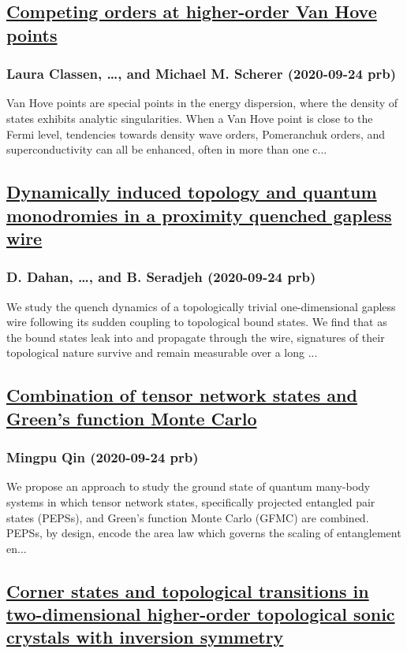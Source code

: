 \subsection*{\href{http://link.aps.org/doi/10.1103/PhysRevB.102.125141}{Competing orders at higher-order Van Hove points}}
\subsubsection*{Laura Classen, \dots, and Michael M. Scherer (2020-09-24 prb)}
Van Hove points are special points in the energy dispersion, where the density of states exhibits analytic singularities. When a Van Hove point is close to the Fermi level, tendencies towards density wave orders, Pomeranchuk orders, and superconductivity can all be enhanced, often in more than one c...
\subsection*{\href{http://link.aps.org/doi/10.1103/PhysRevB.102.125142}{Dynamically induced topology and quantum monodromies in a proximity quenched gapless wire}}
\subsubsection*{D. Dahan, \dots, and B. Seradjeh (2020-09-24 prb)}
We study the quench dynamics of a topologically trivial one-dimensional gapless wire following its sudden coupling to topological bound states. We find that as the bound states leak into and propagate through the wire, signatures of their topological nature survive and remain measurable over a long ...
\subsection*{\href{http://link.aps.org/doi/10.1103/PhysRevB.102.125143}{Combination of tensor network states and Green's function Monte Carlo}}
\subsubsection*{Mingpu Qin (2020-09-24 prb)}
We propose an approach to study the ground state of quantum many-body systems in which tensor network states, specifically projected entangled pair states (PEPSs), and Green's function Monte Carlo (GFMC) are combined. PEPSs, by design, encode the area law which governs the scaling of entanglement en...
\subsection*{\href{http://link.aps.org/doi/10.1103/PhysRevB.102.125144}{Corner states and topological transitions in two-dimensional higher-order topological sonic crystals with inversion symmetry}}
